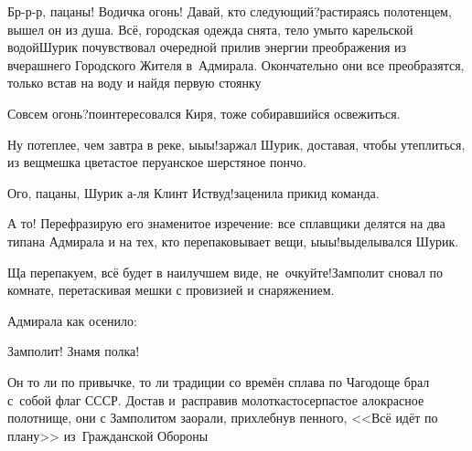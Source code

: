 \diagdash Бр-р-р, пацаны! Водичка огонь! Давай, кто следующий?\mdash растираясь полотенцем, вышел он из душа. Всё, городская одежда снята, тело умыто карельской водой\mdash Шурик почувствовал очередной прилив энергии преображения из вчерашнего Городского Жителя в~Адмирала. Окончательно они все преобразятся, только встав на воду и найдя первую стоянку\myldots{}

\diagdash Совсем огонь?\mdash поинтересовался Киря, тоже собиравшийся освежиться.

\diagdash Ну потеплее, чем завтра в реке, ы\sdash ы\sdash ы!\mdash заржал Шурик, доставая, чтобы утеплиться, из вещмешка цветастое перуанское шерстяное пончо.

\diagdash Ого, пацаны, Шурик а-ля Клинт Иствуд!\mdash заценила прикид команда.

\diagdash А то! Перефразирую его знаменитое изречение: все сплавщики делятся на два типа\mdash на Адмирала и на тех, кто перепаковывает вещи, ы\sdash ы\sdash ы!\mdash выделывался Шурик.


\diagdash Ща перепакуем, всё будет в наилучшем виде, не~очкуйте!\mdash Замполит сновал по комнате, перетаскивая мешки с провизией и снаряжением.

Адмирала как осенило:

\diagdash Замполит! Знамя полка!


Он то ли по привычке, то ли традиции со времён сплава по Чагодоще брал с~собой флаг СССР. Достав и~расправив молоткасто\sdash серпастое ало\sdash красное полотнище, они с Замполитом заорали, прихлебнув пенного, <<Всё идёт по плану>> из~Гражданской Обороны\myldots{}

